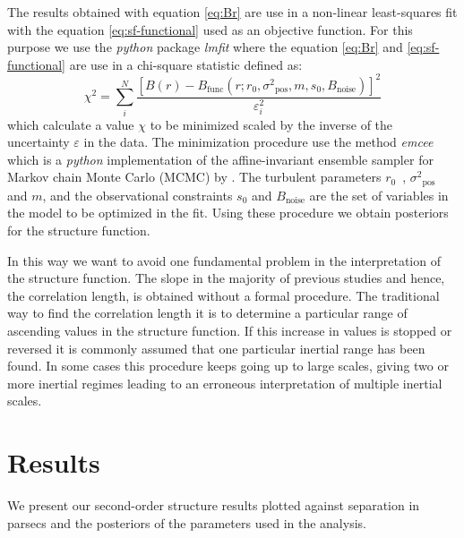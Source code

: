 \documentclass[fleqn,usenatbib, useAMS, a4paper]{mnras}
\newcommand\pos{\ensuremath{_{\mathrm{pos}}}}
\begin{document}
The results obtained with equation \ref{eq:Br} are use in a non-linear least-squares fit with the equation \ref{eq:sf-functional} used as an objective function.
For this purpose we use the \textit{python} package \textit{lmfit} \citep{newville_matthew_2014_11813} where the equation \ref{eq:Br} and \ref{eq:sf-functional} are use in a chi-square statistic defined as:
%
%
%
\begin{equation}\label{eq:chi}
  \chi^2 = \sum_i ^N \frac{[B(r)-B_{\text{func}}(r;r_0, \sigma^2\pos, m, s_0, B_{\text{noise}})]^2}{\varepsilon_i ^2}
\end{equation}
%
which calculate a value \(\chi\) to be minimized scaled by the inverse of the uncertainty \(\varepsilon\) in the data.
The minimization procedure use the method \textit{emcee} \citep{2013PASP..125..306F} which is a \textit{python} implementation of the affine-invariant ensemble sampler for Markov chain Monte Carlo (MCMC) by \citet{2010CAMCS...5...65G}.  
The turbulent parameters \(r_{0}\)\ , \(\sigma^2\pos\) and \(m\), and the observational constraints \(s_0\) and \( B_{\text{noise}}\) are the set of variables in the model to be optimized in the fit.
Using these procedure we obtain posteriors for the structure function.

In this way we want to avoid one fundamental problem in the interpretation of the structure function. 
The slope in the majority of previous studies and hence, the correlation length, is obtained without a formal procedure. 
The traditional way to find the correlation length it is to determine a particular range of ascending values in the structure function. 
If this increase in values is stopped or reversed it is commonly assumed that one particular inertial range has been found. 
In some cases this procedure keeps going up to large scales, giving two or more inertial regimes leading to an erroneous interpretation of multiple inertial scales.

\section{Results}\label{sec:results}

We present our second-order structure results plotted against separation in parsecs and the posteriors of the parameters used in the analysis.
\end{document}
